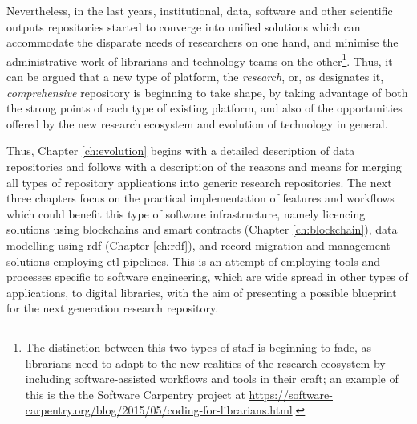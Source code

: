 Nevertheless, in the last years, institutional, data, software and other scientific outputs repositories started to converge into unified solutions which can accommodate the disparate needs of researchers on one hand, and minimise the administrative work of librarians and technology teams on the other\footnote{The distinction between this two types of staff is beginning to fade, as librarians need to adapt to the new realities of the research ecosystem by including software-assisted workflows and tools in their craft; an example of this is the the Software Carpentry project at \url{https://software-carpentry.org/blog/2015/05/coding-for-librarians.html}.}. Thus, it can be argued that a new type of platform, the \emph{research}, or, as \cite{cmu} designates it, \emph{comprehensive} repository is beginning to take shape, by taking advantage of both the strong points of each type of existing platform, and also of the opportunities offered by the new research ecosystem and evolution of technology in general.

Thus, Chapter \ref{ch:evolution} begins with a detailed description of data repositories and follows with a description of the reasons and means for merging all types of repository applications into generic research repositories. The next three chapters focus on the practical implementation of features and workflows which could benefit this type of software infrastructure, namely licencing solutions using blockchains and smart contracts (Chapter \ref{ch:blockchain}), data modelling using \gls{rdf} (Chapter \ref{ch:rdf}), and record migration and management solutions employing \gls{etl} pipelines. This is an attempt of employing tools and processes specific to software engineering, which are wide spread in other types of applications, to digital libraries, with the aim of presenting a possible blueprint for the next generation research repository.

